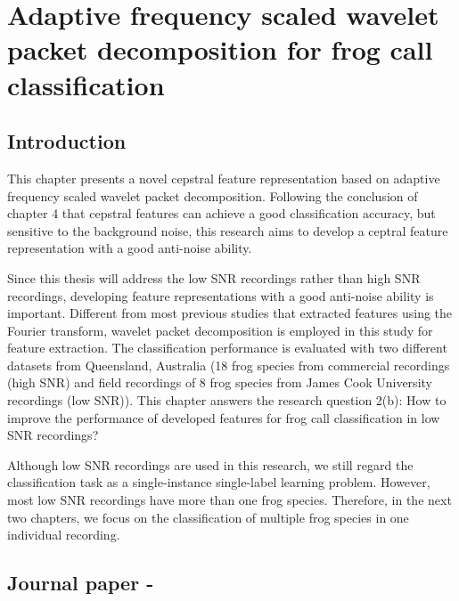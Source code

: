 
\chapter[Adaptive frequency scaled wavelet packet decomposition for frog call classification]{Adaptive frequency scaled wavelet packet decomposition for frog call classification}
\label{cha:cha5Wavelet}


\section{Introduction}
This chapter presents a novel cepstral feature representation based on adaptive frequency scaled wavelet packet decomposition. Following the conclusion of chapter 4 that cepstral features can achieve a good classification accuracy, but sensitive to the background noise, this research aims to develop a ceptral feature representation with a good anti-noise ability.



Since this thesis will address the low SNR recordings rather than high SNR recordings, developing feature representations with a good anti-noise ability is important. Different from most previous studies that extracted features using the Fourier transform, wavelet packet decomposition is employed in this study for feature extraction. The classification performance is evaluated with two different datasets from Queensland, Australia (18 frog species from commercial recordings (high SNR) and field recordings of 8 frog species from James Cook University recordings (low SNR)). This chapter answers the research question 2(b): How to improve the performance of developed features for frog call classification in low SNR recordings? 


Although low SNR recordings are used in this research, we still regard the classification task as a single-instance single-label learning problem.
However, most low SNR recordings have more than one frog species. Therefore, in the next two chapters, we focus on the classification of multiple frog species in one individual recording.





\section{Journal paper - }





